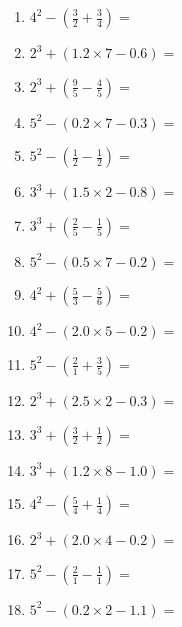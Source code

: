 \documentclass[12pt]{article}
\begin{document}
\begin{enumerate}
\item \large $ 4^{2} - (\frac{3}{2} + \frac{3}{4}) = $ \vspace{1.6cm}
\item \large $ 2^{3} + (1.2 \times 7 - 0.6) = $ \vspace{1.6cm}
\item \large $ 2^{3} + (\frac{9}{5} - \frac{4}{5}) = $ \vspace{1.6cm}
\item \large $ 5^{2} - (0.2 \times 7 - 0.3) = $ \vspace{1.6cm}
\newpage
\item \large $ 5^{2} - (\frac{1}{2} - \frac{1}{2}) = $ \vspace{1.6cm}
\item \large $ 3^{3} + (1.5 \times 2 - 0.8) = $ \vspace{1.6cm}
\item \large $ 3^{3} + (\frac{2}{5} - \frac{1}{5}) = $ \vspace{1.6cm}
\item \large $ 5^{2} - (0.5 \times 7 - 0.2) = $ \vspace{1.6cm}
\item \large $ 4^{2} + (\frac{5}{3} - \frac{5}{6}) = $ \vspace{1.6cm}
\item \large $ 4^{2} - (2.0 \times 5 - 0.2) = $ \vspace{1.6cm}
\item \large $ 5^{2} - (\frac{2}{1} + \frac{3}{5}) = $ \vspace{1.6cm}
\item \large $ 2^{3} + (2.5 \times 2 - 0.3) = $ \vspace{1.6cm}
\item \large $ 3^{3} + (\frac{3}{2} + \frac{1}{2}) = $ \vspace{1.6cm}
\item \large $ 3^{3} + (1.2 \times 8 - 1.0) = $ \vspace{1.6cm}
\newpage
\item \large $ 4^{2} - (\frac{5}{4} + \frac{1}{4}) = $ \vspace{1.6cm}
\item \large $ 2^{3} + (2.0 \times 4 - 0.2) = $ \vspace{1.6cm}
\item \large $ 5^{2} - (\frac{2}{1} - \frac{1}{1}) = $ \vspace{1.6cm}
\item \large $ 5^{2} - (0.2 \times 2 - 1.1) = $ \vspace{1.6cm}

\end{enumerate}
\end{document}
